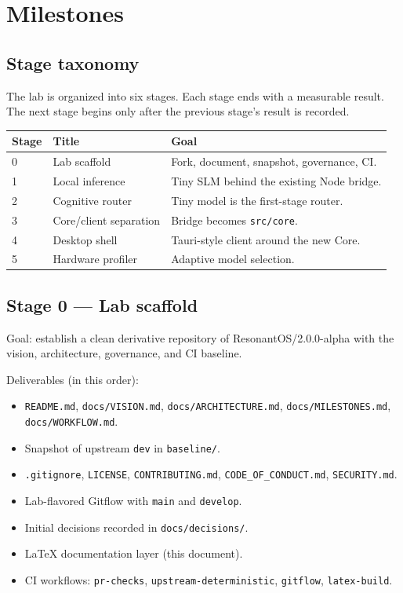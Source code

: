 
\chapter{Milestones}

\section{Stage taxonomy}

The lab is organized into six stages. Each stage ends with a
measurable result. The next stage begins only after the previous
stage's result is recorded.

\begin{longtable}{p{1.0cm}p{3.2cm}p{9.0cm}}
\toprule
\textbf{Stage} & \textbf{Title} & \textbf{Goal} \\
\midrule
0 & Lab scaffold & Fork, document, snapshot, governance, CI. \\
1 & Local inference & Tiny SLM behind the existing Node bridge. \\
2 & Cognitive router & Tiny model is the first-stage router. \\
3 & Core/client separation & Bridge becomes \texttt{src/core}. \\
4 & Desktop shell & Tauri-style client around the new Core. \\
5 & Hardware profiler & Adaptive model selection. \\
\bottomrule
\end{longtable}

\section{Stage 0 --- Lab scaffold}

Goal: establish a clean derivative repository of
ResonantOS/2.0.0-alpha with the vision, architecture, governance,
and CI baseline.

Deliverables (in this order):
\begin{itemize}
  \item \texttt{README.md}, \texttt{docs/VISION.md},
        \texttt{docs/ARCHITECTURE.md}, \texttt{docs/MILESTONES.md},
        \texttt{docs/WORKFLOW.md}.
  \item Snapshot of upstream \texttt{dev} in \texttt{baseline/}.
  \item \texttt{.gitignore}, \texttt{LICENSE}, \texttt{CONTRIBUTING.md},
        \texttt{CODE\_OF\_CONDUCT.md}, \texttt{SECURITY.md}.
  \item Lab-flavored Gitflow with \texttt{main} and \texttt{develop}.
  \item Initial decisions recorded in \texttt{docs/decisions/}.
  \item LaTeX documentation layer (this document).
  \item CI workflows: \texttt{pr-checks}, \texttt{upstream-deterministic},
        \texttt{gitflow}, \texttt{latex-build}.
\end{itemize}

